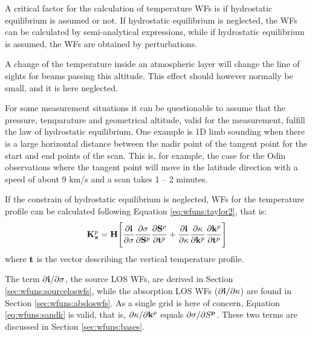  \label{sec:wfuns:temp}
 
 A critical factor for the calculation of temperature WFs is if
 hydrostatic equilibrium is assumed or not. If hydrostatic equilibrium
 is neglected, the WFs can be calculated by semi-analytical
 expressions, while if hydrostatic equilibrium is assumed, the WFs are
 obtained by perturbations. 

 A change of the temperature inside an atmospheric layer will change
 the line of sights for beams passing this altitude. This effect should
 however normally be small, and it is here neglected.

 
 For some measurement situations it can be questionable to assume that
 the pressure, temparature and geometrical altitude, valid for the
 measurement, fulfill the law of hydrostatic equilibrium. One example
 is 1D limb sounding when there is a large horizontal distance between
 the nadir point of the tangent point for the start and end points of
 the scan. This is, for example, the case for the Odin observations
 where the tangent point will move in the latitude direction with a
 speed of about 9 km/s and a scan takes 1 -- 2 minutes.
 
 If the constrain of hydrostatic equilibrium is neglected, WFs for the
 temperature profile can be calculated following Equation
 \ref{eq:wfuns:taylor2}, that is:
 \begin{eqnarray}
    \mathbf{K}_{\mathbf{x}}^p = \mathbf{H} \Bigg[ \frac{\partial\mathbf{i}}{\partial \sigma}
                 \frac{\partial \sigma}{\partial \mathbf{S}^p} 
                 \frac{\partial \mathbf{S}^p}{\partial \mathbf{t}^p} +
                 \frac{\partial\mathbf{i}}{\partial \kappa}
                 \frac{\partial \kappa}{\partial \mathbf{k}^p}
                 \frac{\partial \mathbf{k}^p}{\partial \mathbf{t}^p} \Bigg]
 \end{eqnarray}  
 where $\mathbf{t}$ is the vector describing the vertical temperature profile. 
 
 The term $\partial \mathbf{i}/\partial \sigma$, the source LOS WFs, are
 derived in Section \ref{sec:wfuns:sourceloswfs}, while the absorption
 LOS WFs ($\partial \mathbf{i}/\partial \kappa$) are found in Section
 \ref{sec:wfuns:absloswfs}. As a single grid is here of concern,
 Equation \ref{eq:wfuns:sandk} is valid, that is, $\partial\kappa/
 \partial \mathbf{k}^p$ equals $\partial \sigma / \partial S^{\mathbf{p}}$.
 These two terms are discussed in Section \ref{sec:wfuns:bases}.


